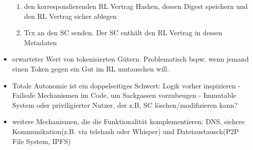 \begin{itemize}
\begin{enumerate}
                    \item den korrespondierenden RL Vertrag Hashen, dessen Digest speichern und den RL Vertrag sicher ablegen
                    \item Trx an den SC senden. Der SC enthält den RL Vertrag in dessen Metadaten
                \end{enumerate}
            \item erwarteter Wert von tokenisierten Gütern. Problematisch bspw. wenn jemand einen Token gegen ein Gut im RL umtauschen will.
            \item Totale Autonomie ist ein doppelseitiges Schwert: Logik vorher inspizieren - Failsafe Mechanismen im Code, um Sackgassen vorzubeugen - Immutable System oder priviligierter Nutzer, der z.B, SC löschen/modifizieren kann?
            \item weitere Mechanismen, die die Funktionalität komplementieren: DNS, sichere Kommunikation(z.B. via telehash oder Whisper) und Dateiaustausch(P2P File System, IPFS)
        \end{itemize}
